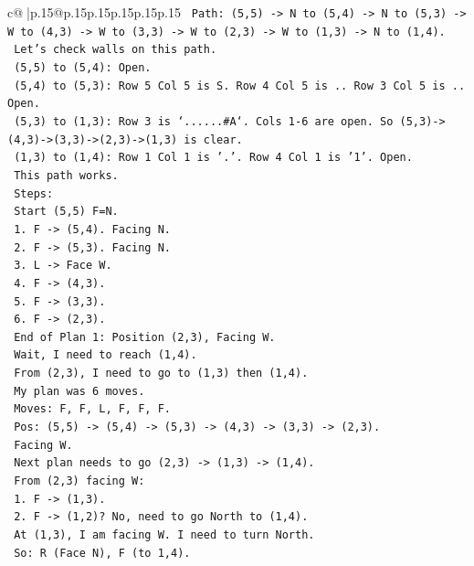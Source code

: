 \documentclass{article}
\begin{document}
{\begin{supertabular}{c@{$\;$}|p{.15\linewidth}@{}p{.15\linewidth}p{.15\linewidth}p{.15\linewidth}p{.15\linewidth}p{.15\linewidth}}
{{{\texttt{     Path: (5,5) {-}> N to (5,4) {-}> N to (5,3) {-}> W to (4,3) {-}> W to (3,3) {-}> W to (2,3) {-}> W to (1,3) {-}> N to (1,4).} \\
\texttt{     Let's check walls on this path.} \\
\texttt{     (5,5) to (5,4): Open.} \\
\texttt{     (5,4) to (5,3): Row 5 Col 5 is S. Row 4 Col 5 is .. Row 3 Col 5 is .. Open.} \\
\texttt{     (5,3) to (1,3): Row 3 is `......\#A`. Cols 1{-}6 are open. So (5,3){-}>(4,3){-}>(3,3){-}>(2,3){-}>(1,3) is clear.} \\
\texttt{     (1,3) to (1,4): Row 1 Col 1 is '.'. Row 4 Col 1 is '1'. Open.} \\
\texttt{     This path works.} \\
\texttt{     Steps:} \\
\texttt{     Start (5,5) F=N.} \\
\texttt{     1. F {-}> (5,4). Facing N.} \\
\texttt{     2. F {-}> (5,3). Facing N.} \\
\texttt{     3. L {-}> Face W.} \\
\texttt{     4. F {-}> (4,3).} \\
\texttt{     5. F {-}> (3,3).} \\
\texttt{     6. F {-}> (2,3).} \\
\texttt{     End of Plan 1: Position (2,3), Facing W.} \\
\texttt{     Wait, I need to reach (1,4).} \\
\texttt{     From (2,3), I need to go to (1,3) then (1,4).} \\
\texttt{     My plan was 6 moves.} \\
\texttt{     Moves: F, F, L, F, F, F.} \\
\texttt{     Pos: (5,5) {-}> (5,4) {-}> (5,3) {-}> (4,3) {-}> (3,3) {-}> (2,3).} \\
\texttt{     Facing W.} \\
\texttt{     Next plan needs to go (2,3) {-}> (1,3) {-}> (1,4).} \\
\texttt{     From (2,3) facing W:} \\
\texttt{     1. F {-}> (1,3).} \\
\texttt{     2. F {-}> (1,2)? No, need to go North to (1,4).} \\
\texttt{     At (1,3), I am facing W. I need to turn North.} \\
\texttt{     So: R (Face N), F (to 1,4).} \\
}}}
\end{supertabular}}
\end{document}
